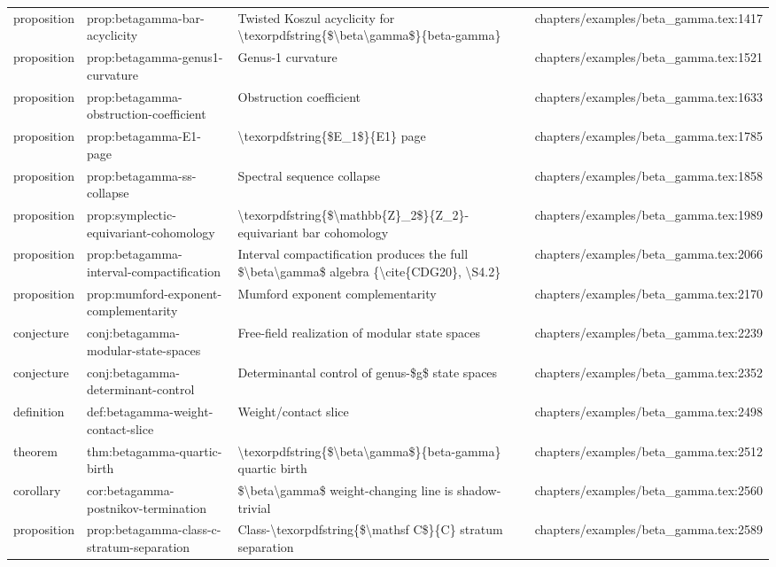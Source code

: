 \documentclass[11pt]{article}
\begin{document}
\begin{longtable}{L{0.10\textwidth}L{0.26\textwidth}L{0.42\textwidth}L{0.22\textwidth}}
proposition & prop:betagamma-bar-acyclicity & Twisted Koszul acyclicity for \textbackslash{}texorpdfstring\{\$\textbackslash{}beta\textbackslash{}gamma\$\}\{beta-gamma\} & chapters/examples/beta\_gamma.tex:1417\\
proposition & prop:betagamma-genus1-curvature & Genus-1 curvature & chapters/examples/beta\_gamma.tex:1521\\
proposition & prop:betagamma-obstruction-coefficient & Obstruction coefficient & chapters/examples/beta\_gamma.tex:1633\\
proposition & prop:betagamma-E1-page & \textbackslash{}texorpdfstring\{\$E\_1\$\}\{E1\} page & chapters/examples/beta\_gamma.tex:1785\\
proposition & prop:betagamma-ss-collapse & Spectral sequence collapse & chapters/examples/beta\_gamma.tex:1858\\
proposition & prop:symplectic-equivariant-cohomology & \textbackslash{}texorpdfstring\{\$\textbackslash{}mathbb\{Z\}\_2\$\}\{Z\_2\}-equivariant bar cohomology & chapters/examples/beta\_gamma.tex:1989\\
proposition & prop:betagamma-interval-compactification & Interval compactification produces the full \$\textbackslash{}beta\textbackslash{}gamma\$ algebra \{\textbackslash{}cite\{CDG20\}, \textbackslash{}S4.2\} & chapters/examples/beta\_gamma.tex:2066\\
proposition & prop:mumford-exponent-complementarity & Mumford exponent complementarity & chapters/examples/beta\_gamma.tex:2170\\
conjecture & conj:betagamma-modular-state-spaces & Free-field realization of modular state spaces & chapters/examples/beta\_gamma.tex:2239\\
conjecture & conj:betagamma-determinant-control & Determinantal control of genus-\$g\$ state spaces & chapters/examples/beta\_gamma.tex:2352\\
definition & def:betagamma-weight-contact-slice & Weight/contact slice & chapters/examples/beta\_gamma.tex:2498\\
theorem & thm:betagamma-quartic-birth & \textbackslash{}texorpdfstring\{\$\textbackslash{}beta\textbackslash{}gamma\$\}\{beta-gamma\} quartic birth & chapters/examples/beta\_gamma.tex:2512\\
corollary & cor:betagamma-postnikov-termination & \$\textbackslash{}beta\textbackslash{}gamma\$ weight-changing line is shadow-trivial & chapters/examples/beta\_gamma.tex:2560\\
proposition & prop:betagamma-class-c-stratum-separation & Class-\textbackslash{}texorpdfstring\{\$\textbackslash{}mathsf C\$\}\{C\} stratum separation & chapters/examples/beta\_gamma.tex:2589\\

\end{longtable}
\end{document}
